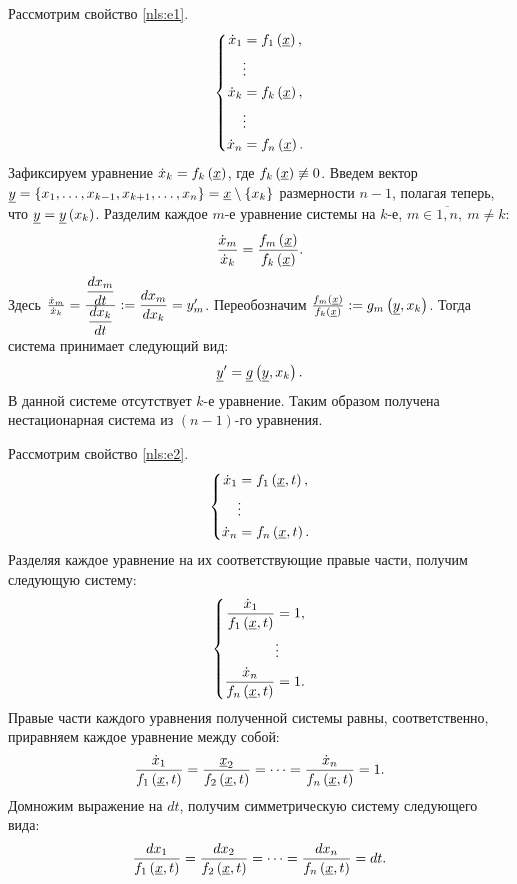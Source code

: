 	Рассмотрим свойство \ref{nls:e1}.
	\[ \left\lbrace \begin{split} 
		\dot{x}_1 &= f_1\left( \underline{x} \right), \\
		&\vdots \\
		\dot{x}_k &= f_k\left( \underline{x} \right), \\
		&\vdots \\
		\dot{x}_n &= f_n\left( \underline{x} \right). \\
	\end{split} \right. \]
	Зафиксируем уравнение $\dot{x}_k = f_k\left( \underline{x} \right)$, где $f_k\left( \underline{x} \right) \not\equiv 0$. Введем вектор \( \underline{y} = \left\lbrace x_1, \dots, x_{k-1}, x_{k+1}, \dots, x_n \right\rbrace = \underline{x} \setminus \left\lbrace x_k \right\rbrace \) размерности $n-1$, полагая теперь, что $\underline{y} = \underline{y}\left( x_k \right)$. Разделим каждое $m$-е уравнение системы на $k$-е, $m \in \overline{1, n}, ~ m \neq k$:
	\[ \frac{\dot{x}_m}{\dot{x}_k} = \frac{f_m\left( \underline{x} \right)}{f_k\left( \underline{x} \right)}. \]
	Здесь $\frac{\dot{x}_m}{\dot{x}_k} = \frac{\dfrac{d x_m}{d t}}{\dfrac{d x_k}{d t}} := \dfrac{d x_m}{d x_k} = y_m'$. Переобозначим $\frac{f_m\left( \underline{x} \right)}{f_k\left( \underline{x} \right)} := g_m\left( \underline{y}, x_k \right)$. Тогда система принимает следующий вид:
	\[ \underline{y}' = \underline{g}\left( \underline{y}, x_k \right). \]
	В данной системе отсутствует $k$-е уравнение. Таким образом получена нестационарная система из $(n-1)$-го уравнения.

	Рассмотрим свойство \ref{nls:e2}.
	\[ \left\lbrace \begin{split} 
		\dot{x}_1 &= f_1\left( \underline{x}, t \right), \\
		&\vdots \\
		\dot{x}_n &= f_n\left( \underline{x}, t \right). \\
	\end{split} \right. \]
	Разделяя каждое уравнение на их соответствующие правые части, получим следующую систему:
	\[ \left\lbrace \begin{split} 
		\frac{\dot{x}_1}{f_1\left( \underline{x}, t \right)} &= 1, \\
		&\vdots \\
		\frac{\dot{x}_n}{f_n\left( \underline{x}, t \right)} &= 1. \\
	\end{split} \right. \]
	Правые части каждого уравнения полученной системы равны, соответственно, приравняем каждое уравнение между собой:
	\[ \frac{\dot{x}_1}{f_1\left( \underline{x}, t \right)} = \frac{\underline{x}_2}{f_2\left( \underline{x}, t \right)} = \dots = \frac{\dot{x}_n}{f_n\left( \underline{x}, t \right)} = 1. \]
	Домножим выражение на $dt$, получим симметрическую систему следующего вида:
	\[ \frac{dx_1}{f_1\left( \underline{x}, t \right)} = \frac{dx_2}{f_2\left( \underline{x}, t \right)} = \dots = \frac{dx_n}{f_n\left( \underline{x}, t \right)} = dt. \]

